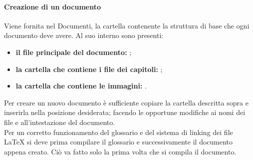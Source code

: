             \paragraph{Creazione di un documento}
            Viene fornita nel  Documenti, la cartella  contenente la struttura di base che ogni documento deve avere. Al suo interno sono presenti: 
            \begin{itemize}
            	\item \textbf{il file principale del documento:} ;
            	\item \textbf{la cartella che contiene i file dei capitoli:} ;
            	\item \textbf{la cartella che contiene le immagini:} .
            \end{itemize}  
	        Per creare un nuovo documento è sufficiente copiare la cartella descritta sopra e inserirla nella posizione desiderata; facendo le opportune modifiche ai nomi dei file e all'intestazione del documento. \\
            Per un corretto funzionamento del glossario e del sistema di linking dei file \LaTeX{} si deve prima compilare il glossario e successivamente il documento appena creato. Ciò va fatto solo la prima volta che si compila il documento.
